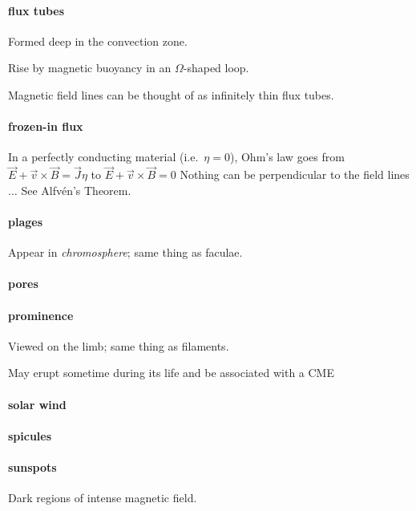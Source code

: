 \documentclass[12pt]{article}
\begin{document}
\paragraph{flux tubes}
    \begin{itemize*}
        \item Formed deep in the convection zone.
        \item Rise by magnetic buoyancy in an $\Omega$-shaped loop.
        \item Magnetic field lines can be thought of as infinitely
          thin flux tubes.
    \end{itemize*}

\paragraph{frozen-in flux}
In a perfectly conducting material (i.e.\ $\eta = 0$),
Ohm's law goes from
$ \vec{E} + \vec{v} \times \vec{B} = \vec{J}\eta $ to
$ \vec{E} + \vec{v} \times \vec{B} = 0 $
Nothing can be perpendicular to the field lines $\ldots$
See Alfv\'en's Theorem.

\paragraph{plages}
    \begin{itemize*}
        \item Appear in \emph{chromosphere}; same thing as faculae.
    \end{itemize*}

\paragraph{pores}

\paragraph{prominence}
    \begin{itemize*}
        \item Viewed on the limb; same thing as filaments.
        \item May erupt sometime during its life and be associated
        with a CME
    \end{itemize*}

\paragraph{solar wind}

\paragraph{spicules}

\paragraph{sunspots}
Dark regions of intense magnetic field.
\end{document}
